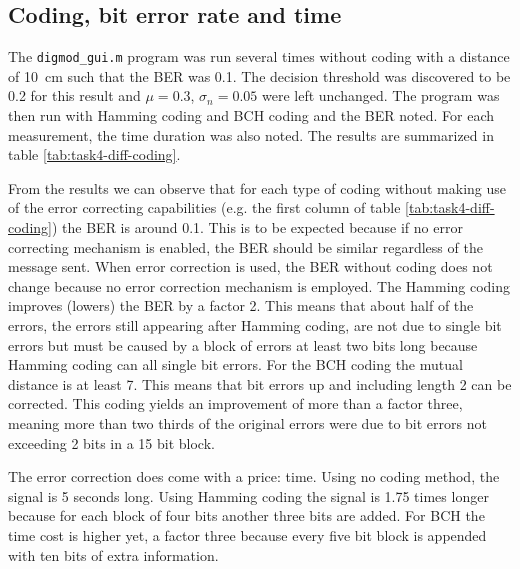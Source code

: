 \documentclass[11pt,titlepage]{report}
\begin{document}
\subsection{Coding, bit error rate and time}
The \texttt{digmod\_gui.m} program was run several times without coding with a distance of \SI{10}{\centi \meter} such that the BER was 0.1. The decision threshold was discovered to be 0.2 for this result and $\mu=0.3$, $\sigma_n=0.05$ were left unchanged. The program was then run with Hamming coding and BCH coding and the BER noted. For each measurement, the time duration was also noted. The results are summarized in table \ref{tab:task4-diff-coding}.

From the results we can observe that for each type of coding without making use of the error correcting capabilities (e.g. the first column of table \ref{tab:task4-diff-coding}) the BER is around 0.1. This is to be expected because if no error correcting mechanism is enabled, the BER should be similar regardless of the message sent. When error correction is used, the BER without coding does not change because no error correction mechanism is employed. The Hamming coding improves (lowers) the BER by a factor 2. This means that about half of the errors, the errors still appearing after Hamming coding, are not due to single bit errors but must be caused by a block of errors at least two bits long because Hamming coding can all single bit errors.
For the BCH coding the mutual distance is at least 7. This means that bit errors up and including length 2 can be corrected. This coding yields an improvement of more than a factor three, meaning more than two thirds of the original errors were due to bit errors not exceeding 2 bits in a 15 bit block.

The error correction does come with a price: time. Using no coding method, the signal is 5 seconds long. Using Hamming coding the signal is 1.75 times longer because for each block of four bits another three bits are added. For BCH the time cost is higher yet, a factor three because every five bit block is appended with ten bits of extra information.
\end{document}
